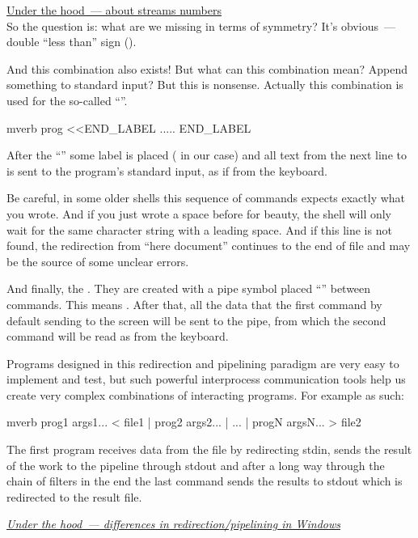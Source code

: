 \href{under_the_hood/streams_numbers.md}{Under the hood~--- about streams numbers}\\

So the question is: what are we missing in terms of symmetry?
It's obvious~--- double ``less than'' sign (\struct{<\hspace{-0.4ex}<}).

And this combination also exists! But what can this combination mean?
Append something to standard input? But this is nonsense. Actually this
combination is used for the so-called ``''.
\begin{code}{mverb}
prog <<END_LABEL
.....
END_LABEL
\end{code}
After the  ``'' some label is placed
( in our case) and all text from the next line
to  is sent to the program's standard input,
as if from the keyboard.

Be careful, in some older shells this sequence of commands expects
exactly what you wrote. And if you just wrote a space before 
for beauty, the shell will only wait for the same character string with a
leading space. And if this line is not found, the redirection from ``here
document'' continues to the end of file and may be the source of some
unclear errors.

And finally, the . They are created with a pipe
symbol placed ``\cmd{|}'' between commands. This means . After that, all the data that the first command by default
sending to the screen will be sent to the pipe, from which the second command
will be read as from the keyboard.

Programs designed in this redirection and pipelining paradigm are very
easy to implement and test, but such powerful interprocess communication
tools help us create very complex combinations of interacting programs.
For example as such:
\begin{code}{mverb}
prog1 args1... < file1 | prog2 args2... | ... | progN argsN... > file2
\end{code}

The first program receives data from the file by redirecting stdin, sends
the result of the work to the pipeline through stdout and after a long
way through the chain of filters in the end the last command sends the
results to stdout which is redirected to the result file.

\href{file://md}%
{\emph{Under the hood~--- differences in redirection/pipelining in Windows}}
